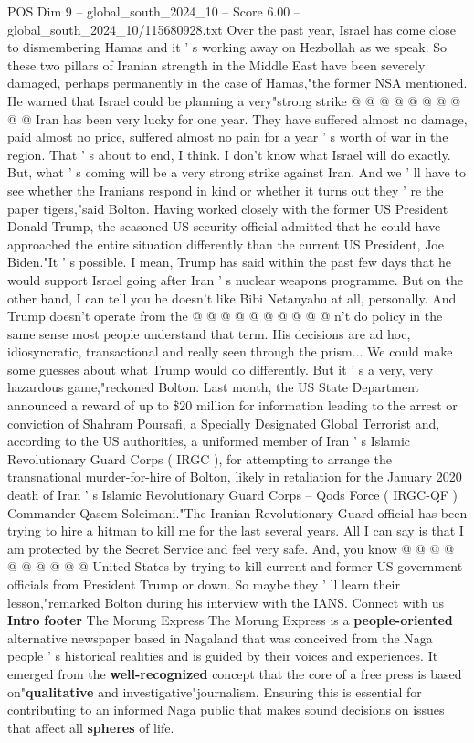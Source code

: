 \begin{textsample}{POS Dim 9 – global\_south\_2024\_10 – Score 6.00 – global\_south\_2024\_10/115680928.txt}
Over the past year, Israel has come close to dismembering Hamas and it ' s working away on Hezbollah as we speak.
So these two pillars of Iranian strength in the Middle East have been severely damaged, perhaps permanently in the case of Hamas,"the former NSA mentioned.
He warned that Israel could be planning a very"strong strike @ @ @ @ @ @ @ @ @ @ Iran has been very lucky for one year.
They have suffered almost no damage, paid almost no price, suffered almost no pain for a year ' s worth of war in the region.
That ' s about to end, I think.
I don't know what Israel will do exactly.
But, what ' s coming will be a very strong strike against Iran.
And we ' ll have to see whether the Iranians respond in kind or whether it turns out they ' re the paper tigers,"said Bolton.
Having worked closely with the former US President Donald Trump, the seasoned US security official admitted that he could have approached the entire situation differently than the current US President, Joe Biden."It ' s possible.
I mean, Trump has said within the past few days that he would support Israel going after Iran ' s nuclear weapons programme.
But on the other hand, I can tell you he doesn't like Bibi Netanyahu at all, personally.
And Trump doesn't operate from the @ @ @ @ @ @ @ @ @ @ n't do policy in the same sense most people understand that term.
His decisions are ad hoc, idiosyncratic, transactional and really seen through the prism...
We could make some guesses about what Trump would do differently.
But it ' s a very, very hazardous game,"reckoned Bolton.
Last month, the US State Department announced a reward of up to \$20 million for information leading to the arrest or conviction of Shahram Poursafi, a Specially Designated Global Terrorist and, according to the US authorities, a uniformed member of Iran ' s Islamic Revolutionary Guard Corps ( IRGC ), for attempting to arrange the transnational murder-for-hire of Bolton, likely in retaliation for the January 2020 death of Iran ' s Islamic Revolutionary Guard Corps -- Qods Force ( IRGC-QF ) Commander Qasem Soleimani."The Iranian Revolutionary Guard official has been trying to hire a hitman to kill me for the last several years.
All I can say is that I am protected by the Secret Service and feel very safe.
And, you know @ @ @ @ @ @ @ @ @ @ United States by trying to kill current and former US government officials from President Trump or down.
So maybe they ' ll learn their lesson,"remarked Bolton during his interview with the IANS.
Connect with us \textbf{Intro} \textbf{footer} The Morung Express The Morung Express is a \textbf{people-oriented} alternative newspaper based in Nagaland that was conceived from the Naga people ' s historical realities and is guided by their voices and experiences.
It emerged from the \textbf{well-recognized} concept that the core of a free press is based on"\textbf{qualitative} and investigative"journalism.
Ensuring this is essential for contributing to an informed Naga public that makes sound decisions on issues that affect all \textbf{spheres} of life.

\end{textsample}
